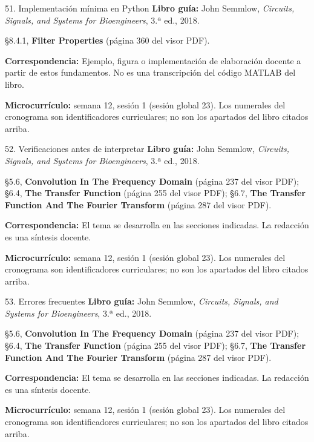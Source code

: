 \documentclass[
  10pt,
  ignorenonframetext,
  aspectratio=169,
  spanish,
]{beamer}
\begin{document}
\begin{frame}{51. Implementación mínima en Python}
\label{implementaciuxf3n-muxednima-en-python-2}
\textbf{Libro guía:} John Semmlow, \emph{Circuits, Signals, and Systems
for Bioengineers}, 3.ª ed., 2018.

§8.4.1, \textbf{Filter Properties} (página 360 del visor PDF).

\textbf{Correspondencia:} Ejemplo, figura o implementación de
elaboración docente a partir de estos fundamentos. No es una
transcripción del código MATLAB del libro.

\textbf{Microcurrículo:} semana 12, sesión 1 (sesión global 23). Los
numerales del cronograma son identificadores curriculares; no son los
apartados del libro citados arriba.
\end{frame}

\begin{frame}{52. Verificaciones antes de interpretar}
\label{verificaciones-antes-de-interpretar-2}
\textbf{Libro guía:} John Semmlow, \emph{Circuits, Signals, and Systems
for Bioengineers}, 3.ª ed., 2018.

§5.6, \textbf{Convolution In The Frequency Domain} (página 237 del visor
PDF); §6.4, \textbf{The Transfer Function} (página 255 del visor PDF);
§6.7, \textbf{The Transfer Function And The Fourier Transform} (página
287 del visor PDF).

\textbf{Correspondencia:} El tema se desarrolla en las secciones
indicadas. La redacción es una síntesis docente.

\textbf{Microcurrículo:} semana 12, sesión 1 (sesión global 23). Los
numerales del cronograma son identificadores curriculares; no son los
apartados del libro citados arriba.
\end{frame}

\begin{frame}{53. Errores frecuentes}
\label{errores-frecuentes-2}
\textbf{Libro guía:} John Semmlow, \emph{Circuits, Signals, and Systems
for Bioengineers}, 3.ª ed., 2018.

§5.6, \textbf{Convolution In The Frequency Domain} (página 237 del visor
PDF); §6.4, \textbf{The Transfer Function} (página 255 del visor PDF);
§6.7, \textbf{The Transfer Function And The Fourier Transform} (página
287 del visor PDF).

\textbf{Correspondencia:} El tema se desarrolla en las secciones
indicadas. La redacción es una síntesis docente.

\textbf{Microcurrículo:} semana 12, sesión 1 (sesión global 23). Los
numerales del cronograma son identificadores curriculares; no son los
apartados del libro citados arriba.
\end{frame}
\end{document}
